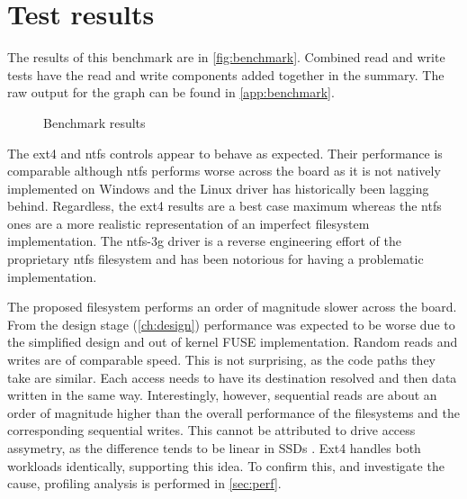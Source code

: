     \section{Test results}

        The results of this benchmark are in \autoref{fig:benchmark}.
        Combined read and write tests have the read and write components added
        together in the summary. The raw output for the graph can be found in
        \autoref{app:benchmark}.

        \begin{figure}[h]
            \caption{Benchmark results}
            
            \label{fig:benchmark}
        \end{figure}

        The ext4 and ntfs controls appear to behave as expected. Their
        performance is comparable although ntfs performs worse across the board
        as it is not natively implemented on Windows and the Linux driver has
        historically been lagging behind. Regardless, the ext4 results are a
        best case maximum whereas the ntfs ones are a more realistic
        representation of an imperfect filesystem implementation. The ntfs-3g
        driver is a reverse engineering effort of the proprietary ntfs
        filesystem and has been notorious for having a problematic
        implementation.

        The proposed filesystem performs an order of magnitude slower across
        the board. From the design stage (\autoref{ch:design}) performance was
        expected to be worse due to the simplified design and out of kernel
        FUSE implementation. Random reads and writes are of comparable speed.
        This is not surprising, as the code paths they take are similar. Each
        access needs to have its destination resolved and then data written in
        the same way. Interestingly, however, sequential reads are about an
        order of magnitude higher than the overall performance of the
        filesystems and the corresponding sequential writes. This cannot be
        attributed to drive access assymetry, as the difference tends to be
        linear in SSDs \cite{servethehome_review}. Ext4 handles both workloads
        identically, supporting this idea. To confirm this, and investigate the
        cause, profiling analysis is performed in \autoref{sec:perf}.


